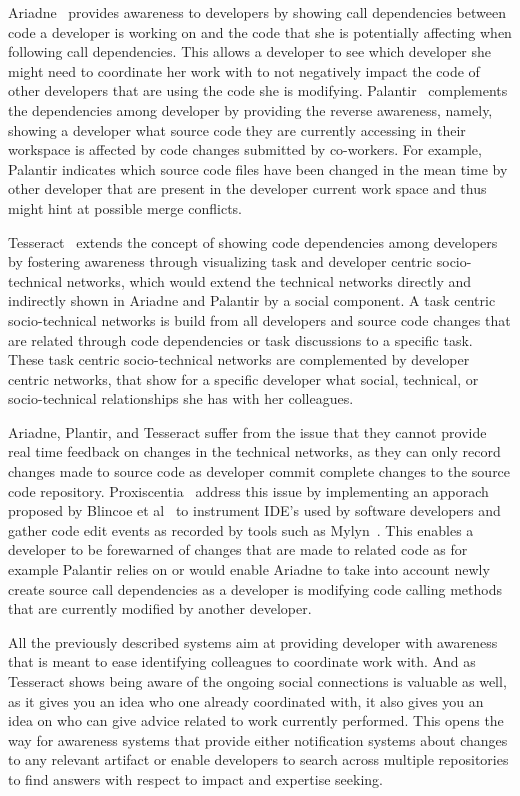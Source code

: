 Ariadne~\cite{trainer2005:ariadne} provides awareness to developers by showing call dependencies between code a developer is working on and the code that she is potentially affecting when following call dependencies.
This allows a developer to see which developer she might need to coordinate her work with to not negatively impact the code of other developers that are using the code she is modifying.
%
Palantir~\cite{sarma:cscw:2002} complements the dependencies among developer by providing the reverse awareness, namely, showing a developer what source code they are currently accessing in their workspace is affected by code changes submitted by co-workers.
For example, Palantir indicates which source code files have been changed in the mean time by other developer that are present in the developer current work space and thus might hint at possible merge conflicts.

Tesseract~\cite{sarma:icse:2009} extends the concept of showing code dependencies among developers by fostering awareness through visualizing task and developer centric socio-technical networks, which would extend the technical networks directly and indirectly shown in Ariadne and Palantir by a social component.
A task centric socio-technical networks is build from all developers and source code changes that are related through code dependencies or task discussions to a specific task.
These task centric socio-technical networks are complemented by developer centric networks, that show for a specific developer what social, technical, or socio-technical relationships she has with her colleagues.

Ariadne, Plantir, and Tesseract suffer from the issue that they cannot provide real time feedback on changes in the technical networks, as they can only record changes made to source code as developer commit complete changes to the source code repository. 
Proxiscentia~\cite{borici:chase:2012} address this issue by implementing an apporach proposed by Blincoe et al~\cite{blincoe:cscw:2012} to instrument IDE's used by software developers and gather code edit events as recorded by tools such as Mylyn~\cite{kersten:aosd:2005}.
This enables a developer to be forewarned of changes that are made to related code as for example Palantir relies on or would enable Ariadne to take into account newly create source call dependencies as a developer is modifying code calling methods that are currently modified by another developer.

All the previously described systems aim at providing developer with awareness that is meant to ease identifying colleagues to coordinate work with.
And as Tesseract shows being aware of the ongoing social connections is valuable as well, as it gives you an idea who one already coordinated with, it also gives you an idea on who can give advice related to work currently performed.
This opens the way for awareness systems that provide either notification systems about changes to any relevant artifact or enable developers to search across multiple repositories to find answers with respect to impact and expertise seeking.

